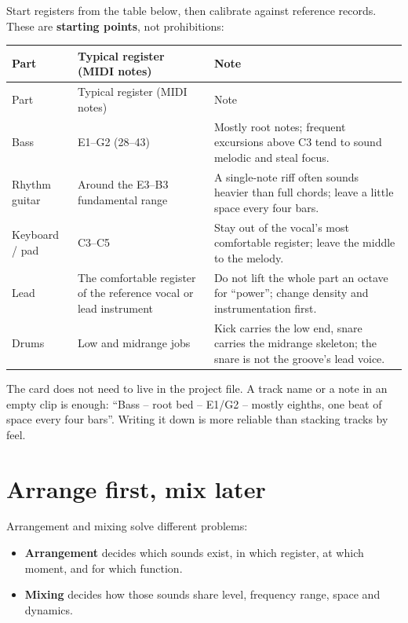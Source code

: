 Start registers from the table below, then calibrate against reference records. These are \textbf{starting points}, not prohibitions:

\begin{longtable}{p{}p{}p{}}
\toprule
Part & Typical register (MIDI notes) & Note \\
\midrule
\endfirsthead
\toprule
Part & Typical register (MIDI notes) & Note \\
\midrule
\endhead
Bass & E1--G2 (28--43) & Mostly root notes; frequent excursions above C3 tend to sound melodic and steal focus. \\
Rhythm guitar & Around the E3--B3 fundamental range & A single-note riff often sounds heavier than full chords; leave a little space every four bars. \\
Keyboard / pad & C3--C5 & Stay out of the vocal's most comfortable register; leave the middle to the melody. \\
Lead & The comfortable register of the reference vocal or lead instrument & Do not lift the whole part an octave for ``power''; change density and instrumentation first. \\
Drums & Low and midrange jobs & Kick carries the low end, snare carries the midrange skeleton; the snare is not the groove's lead voice. \\
\bottomrule
\end{longtable}

\begin{tipbox}
The card does not need to live in the project file. A track name or a note in an empty clip is enough: ``Bass -- root bed -- E1/G2 -- mostly eighths, one beat of space every four bars''. Writing it down is more reliable than stacking tracks by feel.
\end{tipbox}

\section{Arrange first, mix later}
\label{sec:arrangement-before-mixing}

Arrangement and mixing solve different problems:

\begin{itemize}
\item \textbf{Arrangement} decides which sounds exist, in which register, at which moment, and for which function.
\item \textbf{Mixing} decides how those sounds share level, frequency range, space and dynamics.
\end{itemize}

